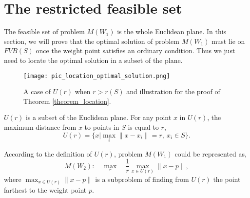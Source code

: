 \documentclass[final,3p,times]{elsarticle}
\begin{document}
\section{The restricted feasible set}
The feasible set of problem $M(W_1)$ is the whole Euclidean plane. In this section, we will prove that the optimal solution of problem $M(W_1)$ must lie on $FVB(S)$ once the weight point satisfies an ordinary condition. Thus we just need to locate the optimal solution in a subset of the plane. %

\label{section_location}
\begin{figure}
  \centering
  \texttt{[image: pic\_location\_optimal\_solution.png]}
  \caption{A case of $U(r)$ when $r>r(S)$ and illustration for the proof of Theorem \ref{theorem_location}.}
  \label{pic_proof_location_optimal_solution}
\end{figure}
\begin{defn}
$U(r)$ is a subset of the Euclidean plane. For any point $x$ in $U(r)$, the maximum distance from $x$ to points in $S$ is equal to $r$,
\begin{equation*}
U(r) = \{x|\max_{i}\|x-x_i\|=r,\ x_i\in S\}.
\end{equation*}
\end{defn}
According to the definition of $U(r)$, problem $M(W_1)$ could be represented as,
\begin{equation}
M(W_2):\quad \max_{r}\quad\frac{1}{r}\max_{x\in U(r)}\|x-p\|,
\end{equation}
where $\max_{x\in U(r)}\|x-p\|$ is a subproblem of finding from $U(r)$ the point farthest to the weight point $p$.
\end{document}
